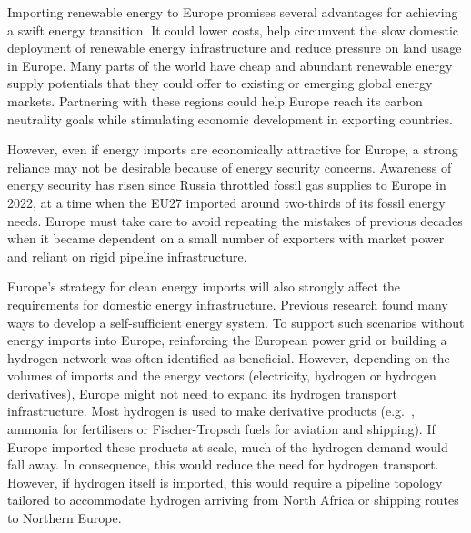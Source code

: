 
Importing renewable energy to Europe promises several advantages for achieving a
swift energy transition. It could lower costs, help circumvent the slow domestic
deployment of renewable energy infrastructure and reduce pressure on land usage
in Europe. Many parts of the world have cheap and abundant renewable energy
supply potentials that they could offer to existing or emerging global energy
markets.\cite{irenaGlobalHydrogen2022,luxSupplyCurves2021,vanderzwaanTimmermansDream2021,fasihiLongTermHydrocarbon2017,reichenbergDeepDecarbonization2022,galvanExportingSunshine2022,armijoFlexibleProduction2020,pfennigGlobalGISbasedPotential2023}
Partnering with these regions could help Europe reach its carbon neutrality
goals while stimulating economic development in exporting countries.


However, even if energy imports are economically attractive for Europe, a strong
reliance may not be desirable because of energy security concerns. Awareness of
energy security has risen since Russia throttled fossil gas supplies to Europe
in 2022,\cite{pedersenLongtermImplications2022} at a time when the EU27 imported
around two-thirds of its fossil energy needs.\cite{eurostatCompleteEnergy2023}
Europe must take care to avoid repeating the mistakes of previous decades when
it became dependent on a small number of exporters with market power and reliant
on rigid pipeline infrastructure.


Europe's strategy for clean energy imports will also strongly affect the
requirements for domestic energy infrastructure. Previous research found many
ways to develop a self-sufficient energy
system.\cite{pickeringDiversityOptions2022,trondleHomemadeImported2019,brownSynergiesSector2018}
To support such scenarios without energy imports into Europe, reinforcing the
European power grid or building a hydrogen network was often identified as
beneficial.\cite{neumannPotentialRole2023,victoriaSpeedTechnological2022}
However, depending on the volumes of imports and the energy vectors
(electricity, hydrogen or hydrogen derivatives), Europe might not need to expand
its hydrogen transport infrastructure. Most hydrogen is used to make derivative
products (e.g.~, ammonia for fertilisers or Fischer-Tropsch fuels for aviation
and shipping).\cite{neumannPotentialRole2023} If Europe imported these products
at scale, much of the hydrogen demand would fall away. In consequence, this
would reduce the need for hydrogen transport. However, if hydrogen itself is
imported, this would require a pipeline topology tailored to accommodate
hydrogen arriving from North Africa or shipping routes to Northern
Europe.

